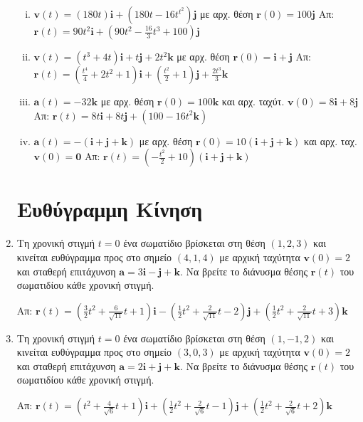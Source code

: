 \begin{enumerate}
\begin{enumerate}[i)]
      \item $ \mathbf{v}(t) =(180t) \mathbf{i}+(180t-16t^{t^{2}}) \mathbf{j} $ με αρχ. 
        θέση $ \mathbf{r}(0)=100 \mathbf{j} $
        \hfill Απ: $ \mathbf{r}(t) = 90t^{2} \mathbf{i}+(90t^{2}- \frac{16}{3} t^{3}+100)
        \mathbf{j} $ 

      \item $ \mathbf{v}(t) = (t^{3}+4t) \mathbf{i} +t \mathbf{j}+2t^{2} \mathbf{k} $ 
        με αρχ. θέση $ \mathbf{r}(0) = \mathbf{i}+ \mathbf{j} $
        \hfill Απ: $ \mathbf{r}(t) = (\frac{t^{4}}{4} + 2t^{2}+1) \mathbf{i}+
        (\frac{t^{2}}{2}+1) \mathbf{j}+ \frac{2t^{3}}{3} \mathbf{k} $  

      \item $ \mathbf{a}(t) = -32 \mathbf{k} $ με αρχ. θέση $ \mathbf{r}(0) = 100
        \mathbf{k} $ και αρχ. ταχύτ. $ \mathbf{v}(0)=8 \mathbf{i}+8 \mathbf{j} $
        \hfill Απ: $ \mathbf{r}(t) = 8t \mathbf{i} +8t \mathbf{j}+ (100-16t^{2}
        \mathbf{k}) $ 

      \item $ \mathbf{a}(t) = -(\mathbf{i}+ \mathbf{j}+ \mathbf{k}) $ με 
        αρχ. θέση $ \mathbf{r}(0) = 10 (\mathbf{i}+\mathbf{j}+\mathbf{k}) $ 
        και αρχ. ταχ. $ \mathbf{v}(0)= \mathbf{0}$ 
        \hfill Απ: $ \mathbf{r}(t) = (- \frac{t^{2}}{2} +10) (\mathbf{i}+  \mathbf{j}+  
        \mathbf{k}) $ 
    \end{enumerate}

    \section*{Ευθύγραμμη Κίνηση}
    
  \item Τη χρονική στιγμή $t=0$ ένα σωματίδιο βρίσκεται στη θέση $ (1,2,3) $ και 
    κινείται ευθύγραμμα προς στο σημείο $ (4,1,4) $ με αρχική ταχύτητα $ \mathbf{v}(0)=2
    $ και σταθερή επιτάχυνση $ \mathbf{a}= 3 \mathbf{i}- \mathbf{j}+ \mathbf{k} $. 
    Να βρείτε το διάνυσμα θέσης $ \mathbf{r}(t) $ του σωματιδίου κάθε χρονική στιγμή.

    \hfill Απ: $ \mathbf{r}(t)=(\frac{3}{2} t^{2}+ \frac{6}{\sqrt{11}} t+1)
    \mathbf{i}-(\frac{1}{2} t^{2}+ \frac{2}{\sqrt{11}} t-2) \mathbf{j}+
    (\frac{1}{2} t^{2}+ \frac{2}{\sqrt{11}}t+3) \mathbf{k} $ 

  \item Τη χρονική στιγμή $t=0$ ένα σωματίδιο βρίσκεται στη θέση $ (1,-1,2) $ και 
    κινείται ευθύγραμμα προς στο σημείο $ (3,0,3) $ με αρχική ταχύτητα $ \mathbf{v}(0)=2
    $ και σταθερή επιτάχυνση $ \mathbf{a}= 2 \mathbf{i}+ \mathbf{j}+ \mathbf{k} $. 
    Να βρείτε το διάνυσμα θέσης $ \mathbf{r}(t) $ του σωματιδίου κάθε χρονική στιγμή.

    \hfill Απ: $ \mathbf{r}(t) = (t^{2}+ \frac{4}{\sqrt{6}} t+1)
    \mathbf{i}+(\frac{1}{2} t^{2}+ \frac{2}{\sqrt{6}} t-1)
    \mathbf{j}+(\frac{1}{2} t^{2}+ \frac{2}{\sqrt{6}} t+2) \mathbf{k} $ 
\end{enumerate}


